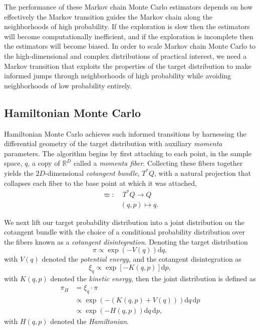 \documentclass[stslayout]{imsart}
\newcommand\dd{\mathrm{d}}
\begin{document}
The performance of these Markov chain Monte Carlo estimators depends
on how effectively the Markov transition guides the Markov chain 
along the neighborhoods of high probability.  If the exploration is
slow then the estimators will become computationally inefficient,
and if the exploration is incomplete then the estimators will become
biased.  In order to scale Markov chain Monte Carlo to the
high-dimensional and complex distributions of practical interest,
we need a Markov transition that exploits the properties of the
target distribution to make informed jumps through neighborhoods
of high probability while avoiding neighborhoods of low probability
entirely.

\subsection{Hamiltonian Monte Carlo}

Hamiltonian Monte Carlo achieves such informed transitions by
harnessing the differential geometry of the target distribution with
auxiliary \emph{momenta} parameters.  The algorithm begins by
first attaching to each point, in the sample space, $q$, a copy of
$\mathbb{R}^{D}$ called a \emph{momenta fiber}.  Collecting these 
fibers together yields the $2D$-dimensional \emph{cotangent bundle}, 
$T^{*} Q$, with a natural projection that collapses each fiber to the 
base point at which it was attached, 
%
\begin{align*}
\varpi:& \; T^{*} Q \rightarrow Q
\\
& (q, p) \mapsto q.
\end{align*}

We next lift our target probability distribution into a joint distribution
on the cotangent bundle with the choice of a conditional probability 
distribution over the fibers known as a \emph{cotangent disintegration}.  
Denoting the target distribution 
%
\begin{equation*}
\pi \propto \exp \! \left( - V ( q ) \right) \dd q,
\end{equation*}
%
with $V ( q )$ denoted the \emph{potential energy}, and the cotangent 
disintegration as
%
\begin{equation*}
\xi_{q} \propto \exp \! \left[ - K (q, p) \right] \dd p,
\end{equation*}
%
with $K (q, p)$ denoted the \emph{kinetic energy}, then the joint distribution
is defined as
%
\begin{align*}
\pi_{H} 
&=
\xi_{q} \cdot \pi
\\
&\propto \exp \! \left( - \left( K (q, p) + V (q) \right) \right) \dd q \, \dd p
\\
&\propto \exp \! \left(- H (q, p) \right) \dd q \, \dd p,
\end{align*}
%
with $H (q, p)$ denoted the \textit{Hamiltonian}.
\end{document}
